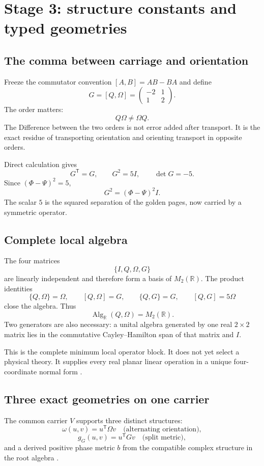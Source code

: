 \documentclass[11pt]{article}
\newcommand{\R}{\mathbb R}
\begin{document}
\section{Stage 3: structure constants and typed geometries}

\subsection{The comma between carriage and orientation}

Freeze the commutator convention $[A,B]=AB-BA$ and define
\[
\boxed{
G=[Q,\Omega]
=
\begin{pmatrix}
-2&1\\1&2
\end{pmatrix}.
}
\]
The order matters:
\[
Q\Omega\neq\Omega Q.
\]
The Difference between the two orders is not error added after transport. It is the exact residue of transporting orientation and orienting transport in opposite orders.

Direct calculation gives
\[
\boxed{G^{\mathsf T}=G,
\qquad
G^2=5I,
\qquad
\det G=-5.}
\]
Since $(\Phi-\Psi)^2=5$,
\[
\boxed{G^2=(\Phi-\Psi)^2I.}
\]
The scalar $5$ is the squared separation of the golden pages, now carried by a symmetric operator.

\subsection{Complete local algebra}

The four matrices
\[
\{I,Q,\Omega,G\}
\]
are linearly independent and therefore form a basis of $M_2(\R)$. The product identities
\[
\{Q,\Omega\}=\Omega,
\qquad
[Q,\Omega]=G,
\qquad
\{Q,G\}=G,
\qquad
[Q,G]=5\Omega
\]
close the algebra. Thus
\[
\boxed{\operatorname{Alg}_{\R}(Q,\Omega)=M_2(\R).}
\]
Two generators are also necessary: a unital algebra generated by one real $2\times2$ matrix lies in the commutative Cayley--Hamilton span of that matrix and $I$.

This is the complete minimum local operator block. It does not yet select a physical theory. It supplies every real planar linear operation in a unique four-coordinate normal form \cite{CoppaMinimumRoot2026,CoppaArchitectureSilence2026}.

\subsection{Three exact geometries on one carrier}

The common carrier $V$ supports three distinct structures:
\[
\omega(u,v)=u^{\mathsf T}\Omega v
\quad\text{(alternating orientation)},
\]
\[
g_G(u,v)=u^{\mathsf T}Gv
\quad\text{(split metric)},
\]
and a derived positive phase metric $b$ from the compatible complex structure in the root algebra \cite{CoppaGLMM2026}.
\end{document}
